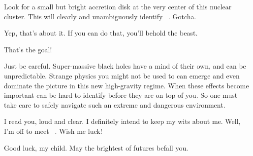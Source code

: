 \documentclass[main.tex]{subfiles}
\begin{document}
\newpara \Electra  Look for a small but bright accretion disk at the very center of this nuclear cluster.  This will clearly and unambiguously identify \rmchiron~.  Gotcha.  

\newpara \Carystus  Yep, that's about it.  If you can do that, you'll behold the beast.  

\newpara \Electra That's the goal!

\newpara \Carystus Just be careful.  Super-massive black holes have a mind of their own, and can be unpredictable.  Strange physics you might not be used to can emerge and even dominate the picture in this new high-gravity regime.  When these effects become important can be hard to identify before they are on top of you.  So one must take care to safely navigate such an extreme and dangerous environment.

\newpara \Electra I read you, loud and clear.  I definitely intend to keep my wits about me.  Well, I'm off to meet \rmchiron~.  Wish me luck!

\newpara \Carystus Good luck, my child.  May the brightest of futures befall you.
\end{document}
